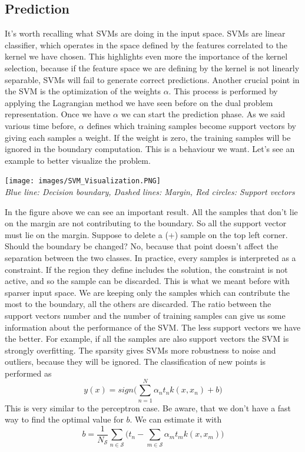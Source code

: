 \documentclass[../main.tex]{subfiles}
\begin{document}
\subsection{Prediction} It's worth recalling what SVMs are doing in the input space. SVMs are linear classifier, which operates in the space defined by the features correlated to the kernel we have chosen. This highlights even more the importance of the kernel selection, because if the feature space we are defining by the kernel is not linearly separable, SVMs will fail to generate correct predictions. Another crucial point in the SVM is the optimization of the weights $\alpha$. This process is performed by applying the Lagrangian method we have seen before on the dual problem representation. Once we have $\alpha$ we can start the prediction phase.
As we said various time before, $\alpha$ defines which training samples become support vectors by giving each samples a weight. If the weight is zero, the training samples will be ignored in the boundary computation. This is a behaviour we want. Let's see an example to better visualize the problem.
\begin{center}
    \texttt{[image: images/SVM\_Visualization.PNG]} \\
    \textit{Blue line: Decision boundary, Dashed lines: Margin, Red circles: Support vectors}
\end{center}
In the figure above we can see an important result. All the samples that don't lie on the margin are not contributing to the boundary. So all the support vector must lie on the margin. Suppose to delete a (+) sample on the top left corner. Should the boundary be changed? No, because that point doesn't affect the separation between the two classes. In practice, every samples is interpreted as a constraint. If the region they define includes the solution, the constraint is not active, and so the sample can be discarded. This is what we meant before with sparser input space. We are keeping only the samples which can contribute the most to the boundary, all the others are discarded. The ratio between the support vectors number and the number of training samples can give us some information about the performance of the SVM. The less support vectors we have the better. For example, if all the samples are also support vectors the SVM is strongly overfitting. The sparsity gives SVMs more robustness to noise and outliers, because they will be ignored.
\newline
The classification of new points is performed as
\begin{equation}
    y(x) = sign \bigg( \sum_{n=1}^N \alpha_n t_n k(x, x_n) +b \bigg)
\end{equation}
This is very similar to the perceptron case. Be aware, that we don't have a fast way to find the optimal value for $b$. We can estimate it with
\begin{equation*}
    b = \frac{1}{N_\mathcal{S}} \sum_{n \in \mathcal{S}} \bigg( t_n - \sum_{m \in \mathcal{S}} \alpha_m t_m k(x,x_m) \bigg)
\end{equation*}
\end{document}
